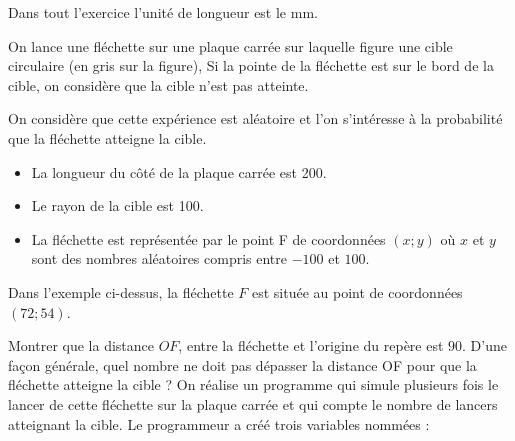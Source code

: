 \documentclass["../Cours.tex"]{subfiles}
\begin{document}
\begin{questions}
    \clearpage
     Dans tout l'exercice l'unité de longueur est le \unit{\milli\metre}.
    
    On lance une fléchette sur une plaque carrée sur laquelle figure une cible circulaire (en gris sur la figure), Si la pointe de la fléchette est sur le bord de la cible, on considère que la cible n'est pas atteinte.
    
    On considère que cette expérience est aléatoire et l'on
    s'intéresse à la probabilité que la fléchette atteigne la cible.
    
    \begin{itemize}
        \item La longueur du côté de la plaque carrée est 200.
        \item Le rayon de la cible est 100.
        \item La fléchette est représentée par le point F de coordonnées
        $(x;y)$ où $x$ et $y$ sont des nombres aléatoires compris entre $-100$ et $100$.
    \end{itemize}

    \begin{center}
    \end{center}
    
    \question Dans l'exemple ci-dessus, la fléchette $F$ est située au point de coordonnées $(72;54)$.
    
    Montrer que la distance $OF$, entre la fléchette et l'origine du repère est $90$.
    \question D'une façon générale, quel nombre ne doit pas dépasser la distance OF pour que la fléchette atteigne la cible ?
    \question On réalise un programme qui simule plusieurs fois le lancer de cette fléchette sur la plaque carrée et qui compte le nombre de lancers atteignant la cible. Le programmeur a créé trois variables nommées : 


\end{questions}
\end{document}
